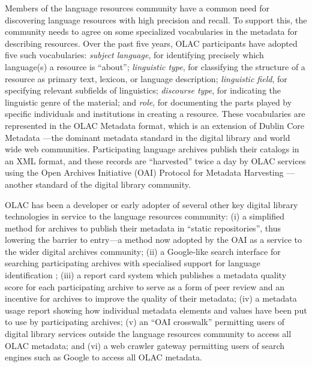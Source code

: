 Members of the language resources community have a common need for
discovering language resources with high precision and recall.  To
support this, the community needs to agree on
some specialized vocabularies in the metadata for
describing resources.  Over the past five years, OLAC
participants have adopted five such vocabularies:
\textit{subject language},
  for identifying precisely which language(s) a resource is ``about'';
\textit{linguistic type},
  for classifying the structure of a resource as primary text,
  lexicon, or language description;
\textit{linguistic field},
  for specifying relevant subfields of linguistics;
\textit{discourse type},
  for indicating the linguistic genre of the material;
  and
\textit{role},
  for documenting the parts played by specific individuals and institutions
  in creating a resource.
These vocabularies are represented in the OLAC Metadata format,
which is an extension of Dublin Core Metadata \citep{BirdSimons04metadata}---the dominant metadata standard in the
digital library and world wide web communities.
Participating language archives publish their catalogs in an XML
format, and these records are ``harvested'' twice a day by OLAC services
using the Open Archives Initiative (OAI) Protocol for Metadata Harvesting
\citep{SimonsBird03lht}---another standard of the digital library community.


OLAC has been a developer or early adopter of several other key
digital library technologies in service to the language resources
community:
(i) a simplified method for archives to publish their metadata in
  ``static repositories'', thus lowering the barrier to entry---a
  method now adopted by the OAI as a service to the wider
  digital archives community;
(ii) a Google-like search interface for searching participating
  archives with specialised support for language identification
  \citep{HughesKamat05,Hughes06lrec};
(iii) a report card system which publishes a metadata quality score
  for each participating archive to serve as a form of
  peer review and an incentive for archives to improve the quality of
  their metadata;
(iv) a metadata usage report showing how individual metadata
  elements and values have been put to use by participating archives;
(v) an ``OAI crosswalk'' permitting users of digital library services
  outside the language resources community to access all OLAC metadata;
  and
(vi) a web crawler gateway permitting users of search engines such
  as Google to access all OLAC metadata.

